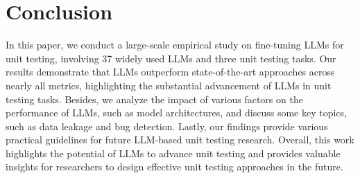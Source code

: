 \sloppy
\section{Conclusion}
\label{sec:conclusion}

In this paper, we conduct a large-scale empirical study on fine-tuning LLMs for unit testing, involving 37 widely used LLMs and three unit testing tasks. 
Our results demonstrate that LLMs outperform state-of-the-art approaches across nearly all metrics, highlighting the substantial advancement of LLMs in unit testing tasks. 
Besides, we analyze the impact of various factors on the performance of LLMs, such as model architectures, and discuss some key topics, such as data leakage and bug detection.
Lastly, our findings provide various practical guidelines for future LLM-based unit testing research.
Overall, this work highlights the potential of LLMs to advance unit testing and provides valuable insights for researchers to design effective unit testing approaches in the future.
